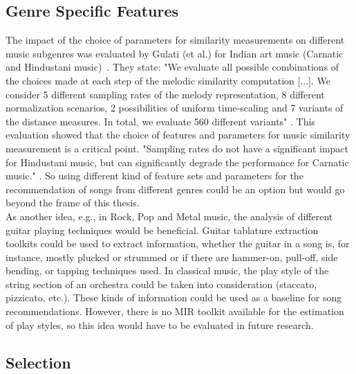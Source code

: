\subsection{Genre Specific Features}

The impact of the choice of parameters for similarity measurements on different music subgenres was evaluated by Gulati (et al.) for Indian art music (Carnatic and Hindustani music)~\cite{mussim1}. They state: "We evaluate all possible combinations of the choices made at each step of the melodic similarity computation [...].  We consider 5 different sampling rates of the melody representation, 8 different normalization scenarios, 2 possibilities of uniform time-scaling and 7 variants of the distance measures.  In total, we evaluate 560 different variants" \cite[p. 3]{mussim1}. This evaluation showed that the choice of features and parameters for music similarity measurement is a critical point. "Sampling rates do not have a significant impact for Hindustani music, but can significantly degrade the performance for Carnatic music." \cite[p. 3]{mussim1}. So using different kind of feature sets and parameters for the recommendation of songs from different genres could be an option but would go beyond the frame of this thesis.\\
As another idea, e.g., in Rock, Pop and Metal music, the analysis of different guitar playing techniques would be beneficial. Guitar tablature extraction~\cite{guitext1} toolkits could be used to extract information, whether the guitar in a song is, for instance, mostly plucked or strummed or if there are hammer-on, pull-off, side bending, or tapping techniques used. In classical music, the play style of the string section of an orchestra could be taken into consideration (staccato, pizzicato, etc.). These kinds of information could be used as a baseline for song recommendations. 
However, there is no MIR toolkit available for the estimation of play styles, so this idea would have to be evaluated in future research.

\subsection{Selection}

